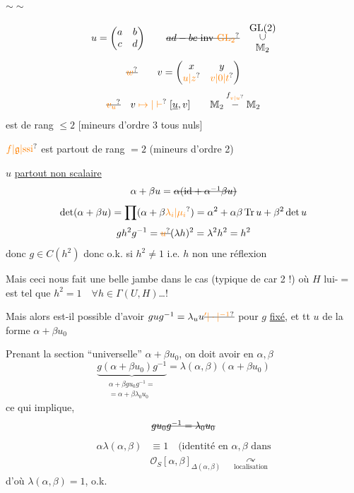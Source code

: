 \begin{center}$\sim\!\sim$\end{center}

\[
 u=\begin{pmatrix}a&b\\c&d\end{pmatrix}
 \qquad\deleted{ad-bc\ \mathrm{inv}\ \unsure{\mathrm{GL}_2}}\quad
 \begin{matrix}\operatorname{GL}(2)\\[-2pt]\rotatebox{90}{$\subset$}\\[-2pt]\mathbb M_2\end{matrix}
\]
\[
 \deleted{\unsure{w}}\qquad
 v=\begin{pmatrix}x&y\\\unsure{u|z}&\unsure{v|0|t}\end{pmatrix}
\]
\[
 \deleted{\unsure{v_u}}\quad v\mathrel{\unsure{\mapsto|\vdash}}[\underline u,v]
 \qquad \mathbb M_2\overset{f_{\unsure{v|u}}}{-}\mathbb M_2
\]
 est  de rang $\leq2$ [mineurs d'ordre 3 tous nuls]

$\unsure{f|\mathfrak g|\mathrm{ssi}}$  est partout de rang $=2$ (mineurs d'ordre 2)

 $u$ \uline{partout non scalaire}
\[
 \alpha+\beta u=\deleted{\alpha(\mathrm{id}+\alpha^{-1}\beta u)}
\]
\[
 \det(\alpha+\beta u)=\prod(\alpha+\beta\unsure{\lambda_i|\mu_i})
 =\alpha^2+\alpha\beta\operatorname{Tr}u+\beta^2\det u
\]
\[
 gh^2g^{-1}=\deleted{\unsure{u}}(\lambda h)^2=\lambda^2h^2=h^2
\]
donc $g\in C(h^2)$ donc o.k. si $h^2\ne1$ i.e. $h$ non une réflexion

Mais ceci nous fait une belle jambe dans le cas (typique de car 2 !) où  $H$ lui-$=$ est tel que $h^2=1\quad\forall h\in\Gamma(U,H)$\ldots!

 Mais alors est-il possible d'avoir $gug^{-1}=\lambda_u u\deleted{\unsure{{}^{\prime}|\cdot|{}^{-1}}}$ \deleted{\(\forall\)} pour $g$ \uline{fixé}, et tt $u$  de la  forme $\alpha+\beta u_0$

Prenant la section ``universelle'' $\alpha+\beta u_0$, on doit avoir  en $\alpha,\beta$
\[
 \underbrace{g(\alpha+\beta u_0)g^{-1}}_{\begin{gathered}
 \alpha+\beta gu_0g^{-1}=\\[-2pt]
 =\alpha+\beta\lambda_0u_0
 \end{gathered}}
 =\lambda(\alpha,\beta)(\alpha+\beta u_0)
\]
ce qui implique, 
\[
 \deleted{gu_0g^{-1}=\lambda_0u_0}
\]
\[
\begin{aligned}
 \alpha\lambda(\alpha,\beta)&\equiv1 \quad\text{(identité en $\alpha,\beta$ dans}\\
 &\mathcal O_S[\alpha,\beta]_{\Delta(\alpha,\beta)}
 \quad\underset{\text{localisation}}{\curvearrowright}
\end{aligned}
\]
d'où $\lambda(\alpha,\beta)=1$, o.k.

